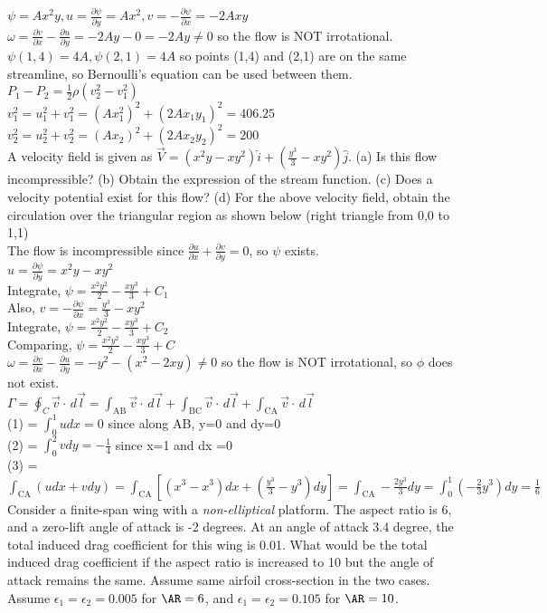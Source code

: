 \documentclass[12pt, twocolumn, letterpaper]{article}
\begin{document}
$\psi=Ax^2y,u=\frac{\partial \psi}{\partial y}=Ax^2, v=-\frac{\partial \psi}{\partial x}=-2Axy$\\
$\omega=\frac{\partial v}{\partial x}-\frac{\partial u}{\partial y}=-2Ay-0=-2Ay\neq0$ so the flow is NOT irrotational.\\
$\psi(1,4)=4A,\psi(2,1)=4A$ so points (1,4) and (2,1) are on the same streamline, so Bernoulli's equation can be used between them.\\
$P_1-P_2=\frac{1}{2}\rho\left(v_2^2-v_1^2\right)$\\
$v_1^2=u_1^2+v_1^2=(Ax_1^2)^2+(2Ax_1y_1)^2=406.25$\\
$v_2^2=u_2^2+v_2^2=(Ax_2)^2+(2Ax_2y_2)^2=200$\\
\hline
A velocity field is given as $\vec{V}=(x^2y-xy^2)\hat{i}+\left(\frac{y^3}{3}-xy^2\right)\hat{j}$. (a) Is this flow incompressible? (b) Obtain the expression of the stream function. (c) Does a velocity potential exist for this flow? (d) For the above velocity field, obtain the circulation over the triangular region as shown below (right triangle from 0,0 to 1,1)\\
The flow is incompressible since $\frac{\partial u}{\partial x}+\frac{\partial v}{\partial y}=0$, so $\psi$ exists.\\
$u=\frac{\partial \psi}{\partial y}=x^2y-xy^2$\\
Integrate, $\psi=\frac{x^2y^2}{2}-\frac{xy^3}{3}+C_1$\\
Also, $v=-\frac{\partial \psi}{\partial x}=\frac{y^3}{3}-xy^2$\\
Integrate, $\psi=\frac{x^2y^2}{2}-\frac{xy^3}{3}+C_2$\\
Comparing, $\psi=\frac{x^2y^2}{2}-\frac{xy^3}{3}+C$\\
$\omega=\frac{\partial v}{\partial x}-\frac{\partial u}{\partial y}=-y^2-(x^2-2xy)\neq0$ so the flow is NOT irrotational, so $\phi$ does not exist.\\
$\Gamma=\oint_C\vec{v}\cdot\,d\vec{l}=\int_\text{AB}\vec{v}\cdot\,d\vec{l}+\int_\text{BC}\vec{v}\cdot\,d\vec{l}+\int_\text{CA}\vec{v}\cdot\,d\vec{l}$\\
(1) = $\int_0^1udx=0$ since along AB, y=0 and dy=0\\
(2) = $\int_0^2vdy=-\frac{1}{4}$ since x=1 and dx =0\\
(3) = $\int_\text{CA}(udx+vdy)=\int_\text{CA}\left[(x^3-x^3)dx+(\frac{y^3}{3}-y^3)dy\right]=\int_\text{CA}-\frac{2y^3}{3}dy=\int_0^1(-\frac{2}{3}y^3)dy=\frac{1}{6}$\\
\hline
Consider a finite-span wing with a \textit{non-elliptical} platform. The aspect ratio is 6, and a zero-lift angle of attack is -2 degrees. At an angle of attack 3.4 degree, the total induced drag coefficient for this wing is 0.01. What would be the total induced drag coefficient if the aspect ratio is increased to 10 but the angle of attack remains the same. Assume same airfoil cross-section in the two cases. Assume $\epsilon_1=\epsilon_2=0.005$ for $\AR=6$, and $\epsilon_1=\epsilon_2=0.105$ for $\AR=10$.\\
\end{document}

